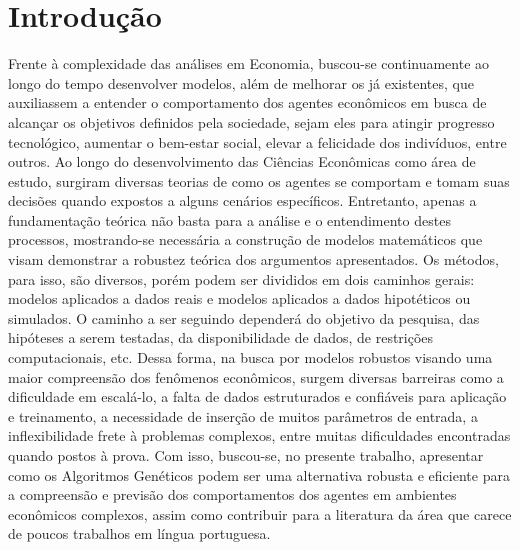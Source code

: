 \chapter{Introdução}

Frente à complexidade das análises em Economia, buscou-se continuamente ao longo do tempo desenvolver modelos, além de melhorar os já existentes, que auxiliassem a entender o comportamento dos agentes econômicos em busca de alcançar os objetivos definidos pela sociedade, sejam eles para atingir progresso tecnológico, aumentar o bem-estar social, elevar a felicidade dos indivíduos, entre outros. Ao longo do desenvolvimento das Ciências Econômicas como área de estudo, surgiram diversas teorias de como os agentes se comportam e tomam suas decisões quando expostos a alguns cenários específicos. Entretanto, apenas a fundamentação teórica não basta para a análise e o entendimento destes processos, mostrando-se necessária a construção de modelos matemáticos que visam demonstrar a robustez teórica dos argumentos apresentados. Os métodos, para isso, são diversos, porém podem ser divididos em dois caminhos gerais: modelos aplicados a dados reais e modelos aplicados a dados hipotéticos ou simulados. O caminho a ser seguindo dependerá do objetivo da pesquisa, das hipóteses a serem testadas, da disponibilidade de dados, de restrições computacionais, etc. Dessa forma, na busca por modelos robustos visando uma maior compreensão dos fenômenos econômicos, surgem diversas barreiras como a dificuldade em escalá-lo, a falta de dados estruturados e confiáveis para aplicação e treinamento, a necessidade de inserção de muitos parâmetros de entrada, a inflexibilidade frete à problemas complexos, entre muitas dificuldades encontradas quando postos à prova. Com isso, buscou-se, no presente trabalho, apresentar como os Algoritmos Genéticos podem ser uma alternativa robusta e eficiente para a compreensão e previsão dos comportamentos dos agentes em ambientes econômicos complexos, assim como contribuir para a literatura da área que carece de poucos trabalhos em língua portuguesa.

